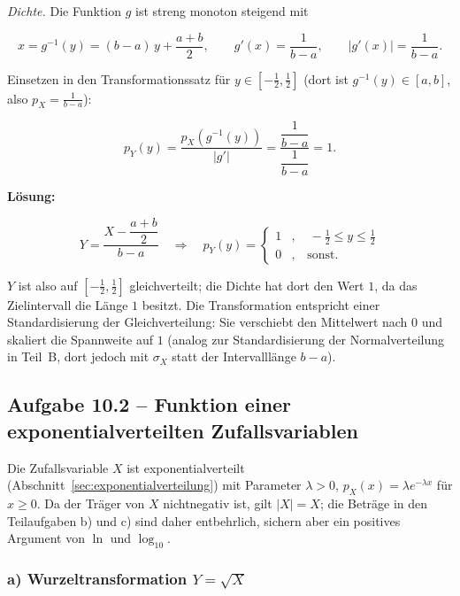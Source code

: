 \begin{beispiel}
\emph{Dichte.} Die Funktion $g$ ist streng monoton steigend mit

$$
x = g^{-1}(y) = (b - a)\, y + \frac{a + b}{2}, \qquad
g'(x) = \frac{1}{b - a}, \qquad |g'(x)| = \frac{1}{b - a}.
$$

Einsetzen in den Transformationssatz für $y \in \left[-\tfrac12, \tfrac12\right]$
(dort ist $g^{-1}(y) \in [a, b]$, also $p_X = \tfrac{1}{b-a}$):

$$
p_Y(y) = \frac{p_X\!\left(g^{-1}(y)\right)}{|g'|}
       = \frac{\dfrac{1}{b - a}}{\dfrac{1}{b - a}}
       = 1.
$$

\textbf{Lösung:}

$$
\boxed{\;Y = \frac{X - \dfrac{a + b}{2}}{b - a}
\quad\Longrightarrow\quad
p_Y(y) = \begin{cases} 1 & , \quad -\tfrac{1}{2} \leq y \leq \tfrac{1}{2} \\[4pt]
0 & , \quad \text{sonst.} \end{cases}\;}
$$

$Y$ ist also auf $\left[-\tfrac{1}{2}, \tfrac{1}{2}\right]$ gleichverteilt; die
Dichte hat dort den Wert $1$, da das Zielintervall die Länge $1$ besitzt. Die
Transformation entspricht einer Standardisierung der Gleichverteilung: Sie
verschiebt den Mittelwert nach $0$ und skaliert die Spannweite auf $1$
(analog zur Standardisierung der Normalverteilung in Teil~B, dort jedoch mit
$\sigma_X$ statt der Intervalllänge $b - a$).

\end{beispiel}

\subsection*{Aufgabe 10.2 – Funktion einer exponentialverteilten Zufallsvariablen}

Die Zufallsvariable $X$ ist exponentialverteilt
(Abschnitt~\ref{sec:exponentialverteilung}) mit Parameter $\lambda > 0$,
$p_X(x) = \lambda e^{-\lambda x}$ für $x \geq 0$. Da der Träger von $X$
nichtnegativ ist, gilt $|X| = X$; die Beträge in den Teilaufgaben b) und c)
sind daher entbehrlich, sichern aber ein positives Argument von $\ln$ und
$\log_{10}$.

\subsubsection*{a) Wurzeltransformation $Y = \sqrt{X}$}

